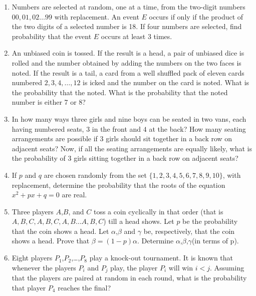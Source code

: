 \documentclass[journal,12pt,onecolumn]{IEEEtran}
\theoremstyle{remark}
\begin{document}
\begin{enumerate}
\hfill{}

\item Numbers are selected at random, one at a time, from the two-digit numbers $00, 01, 02 \dots 99 $ with replacement. An event $E$ occurs if only if the product of the two digits of a selected number is 18. If four numbers are selected, find probability that the event $E$ occurs at least 3 times.

\hfill{}

\item An unbiased coin is tossed. If the result is a head, a pair of unbiased dice is rolled and the number obtained by adding the numbers on the two faces is noted. If the result is a tail, a card from a well shuffled pack of eleven cards numbered $ 2, 3, 4, \dots , 12 $ is icked and the number on the card is noted. What is the probability that the noted. What is the probability that the noted number is either 7 or 8?

\hfill{}

\item In how many ways three girls and nine boys can be seated in two vans, each having numbered seats, $3$ in the front and $4$ at the back? How many seating arrangements are possible if 3 girls should sit together in a back row on adjacent seats? Now, if all the seating arrangements are equally likely, what is the probability of 3 girls sitting together in a back row on adjacent seats?

\hfill{}

\item If $p$ and $q$ are chosen randomly from the set $\{1,2,3,4,5,6,7,8,9,10\}$, with replacement, determine the probability that the roots of the equation $x^2+px+q=0$ are real.
                                                      
\hfill{}

\item Three players $A$,$B$, and $C$ toss a coin cyclically in that order (that is$ A,B,C,A,B,C,A,B \dots A,B,C $) till a head shows. Let $p$ be the probability that the coin shows a head. Let $\alpha$,$\beta$ and $\gamma$ be, respectively, that the coin shows a head. Prove that $\beta=(1-p)\alpha$. Determine $\alpha$,$\beta$,$\gamma$(in terms of p).

\hfill{}

\item Eight players $P_{1}$,$P_{2}$,\dots ,$P_{8}$ play a knock-out tournament. It is known that whenever the players $P_{i}$ and $P_{j}$ play, the player $P_{i}$ will win $i<j$. Assuming that the players are paired at random in each round, what is the probability that player $P_{4}$ reaches the final?


\end{enumerate}
\end{document}
